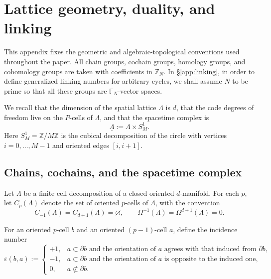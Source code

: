 \documentclass[dvipsnames,a4paper]{article}
\numberwithin{equation}{section}
\theoremstyle{definition}
\theoremstyle{remark}
\begin{document}
\section{Lattice geometry, duality, and linking}
\label{app:geometry}

This appendix fixes the geometric and algebraic-topological conventions used throughout the
paper. All chain groups, cochain groups, homology groups, and cohomology groups are taken
with coefficients in $\mathbb Z_N$. In \S\ref{app:linking}, in order to define generalized linking numbers for arbitrary cycles, we shall assume $N$ to be prime so that all these groups are $\mathbb F_N$-vector spaces.

We recall that the dimension of the spatial lattice $\Lambda$ is $d$, that the code degrees of freedom live on the \(P\)-cells of \(\Lambda\), and that the spacetime complex is
\begin{equation}
	\underline\Lambda:=\Lambda\times S^1_M .
	\label{eq:spacetime}
\end{equation}
Here \(S^1_M=\mathbb Z/M\mathbb Z\) is the cubical decomposition of the circle with
vertices \(i=0,\dots,M-1\) and oriented edges \([i,i+1]\).

\subsection{Chains, cochains, and the spacetime complex}\label{app:geometryBasics}

Let \(\Lambda\) be a finite cell decomposition of a closed oriented \(d\)-manifold.
For each \(p\), let \(C_p(\Lambda)\) denote the set of oriented \(p\)-cells of \(\Lambda\),
with the convention
\begin{equation}
	C_{-1}(\Lambda)=C_{d+1}(\Lambda)=\varnothing,
	\qquad
	\Omega^{-1}(\Lambda)=\Omega^{d+1}(\Lambda)=0.
\end{equation}

For an oriented \(p\)-cell \(b\) and an oriented \((p-1)\)-cell \(a\), define the
incidence number
\begin{equation}
	\varepsilon(b,a):=
	\begin{cases}
		+1, & a\subset \partial b \text{ and the orientation of } a
		\text{ agrees with that induced from } \partial b,\\
		-1, & a\subset \partial b \text{ and the orientation of } a
		\text{ is opposite to the induced one},\\
		0, & a\not\subset \partial b.
	\end{cases}
	\label{eq:incidence}
\end{equation}
\end{document}
